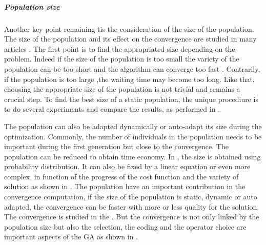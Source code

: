 \subparagraph{Population size}
Another key point remaining tis the consideration of the size  of the population. The size of the population and its effect on the convergence are studied in many articles \cite{64*matsui1999,70*arabas1994,71*grefenstette1986,77*shi2005,97*goldberg1985,109*cerf1995}. 
The first point is to find the appropriated size depending on the problem. Indeed if the size of the population is too small the variety of the population can be too short and the algorithm can converge too fast \cite{70*arabas1994}. Contrarily, if the population is too large ,the waiting time may become too long.  
Like that, choosing the appropriate size of the population is not trivial and remains a crucial step. To find the best size of a static population, the unique procediure is to do several experiments and compare the results, as performed in \cite{71*grefenstette1986}.

 The population can also be adapted dynamically or auto-adapt its size during the optimization. Commonly, the number of individuals in the population needs to be important during the first generation but close to the convergence. The population can be reduced to obtain time economy.
  In \cite{133*schwefel1984}, the size is obtained using probability distribution. It can also be fixed by a linear equation or even more complex, in function of the progress of the cost function and the variety of solution as shown in \cite{70*arabas1994}. The population have an important contribution in the convergence computation,  if the size of the population is static, dynamic or auto adapted, the convergence can be faster with more or less quality for the solution. The convergence is studied in the \cite{109*cerf1995}. But the convergence is not only linked by the population size but also the selection, the coding and the operator choice are important aspects of the GA as shown in \cite{71*grefenstette1986,77*shi2005}.  



